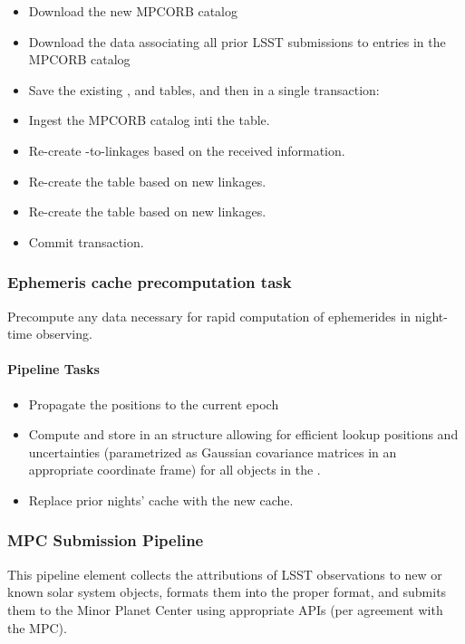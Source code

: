 \begin{itemize}
	\item Download the new MPCORB catalog
	\item Download the data associating all prior LSST submissions to entries in the MPCORB catalog
	\item Save the existing \MPCORB, \SSObject and \SSSource tables, and then in a single transaction:
	\item Ingest the MPCORB catalog inti the \MPCORB table.
	\item Re-create \DIASource-to-\MPCORB linkages based on the received information.
	\item Re-create the \SSObject table based on new linkages.
	\item Re-create the \SSSource table based on new linkages.
	\item Commit transaction.
\end{itemize}


\subsubsection{Ephemeris cache precomputation task}

Precompute any data necessary for rapid computation of ephemerides in night-time observing.

\paragraph{Pipeline Tasks}

\begin{itemize}
	\item Propagate the \MPCORB positions to the current epoch
	\item Compute and store in an structure allowing for efficient lookup positions and uncertainties (parametrized as Gaussian covariance matrices in an appropriate coordinate frame) for all objects in the \MPCORB.
	\item Replace prior nights' cache with the new cache.
\end{itemize}


\subsubsection{MPC Submission Pipeline}

This pipeline element collects the attributions of LSST observations to new or known solar system objects, formats them into the proper format, and submits them to the Minor Planet Center using appropriate APIs (per agreement with the MPC).

